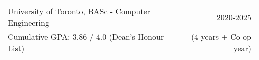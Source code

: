 \begin{tabularx}{\textwidth}{ @{}X r@{} }
    University of Toronto, BASc - Computer Engineering & 2020-2025 \\
    Cumulative GPA: 3.86 / 4.0 (Dean’s Honour List) & (4 years + Co-op year) \\
\end{tabularx}